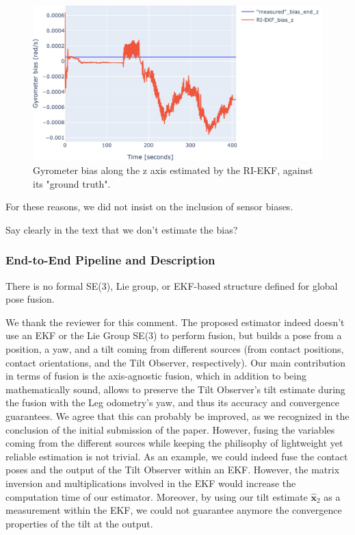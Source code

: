 \begin{figure}[!ht]
\begin{center}
\includegraphics[width=\textwidth]{bias_z.pdf} 
\vskip -0.5pc
\caption{Gyrometer bias along the z axis estimated by the RI-EKF, against its "ground truth".}\label{fig:bias}
\end{center}
\vskip -1.5pc
\end{figure}

For these reasons, we did not insist on the inclusion of sensor biases.


\alert{Say clearly in the text that we don't estimate the bias?}

 

\subsubsection{End-to-End Pipeline and Description}




\begin{revquote}\hypertarget{CommentSe3Fusion}{}
There is no formal SE(3), Lie group, or EKF-based structure defined for global pose fusion.
\end{revquote}


We thank the reviewer for this comment. The proposed estimator indeed doesn't use an EKF or the Lie Group SE(3) to perform fusion, but builds a pose from a position, a yaw, and a tilt coming from different sources (from contact positions, contact orientations, and the Tilt Observer, respectively). Our main contribution in terms of fusion is the axis-agnostic fusion, which in addition to being mathematically sound, allows to preserve the Tilt Observer's tilt estimate during the fusion with the Leg odometry's yaw, and thus its accuracy and convergence guarantees. We agree that this can probably be improved, as we recognized in the conclusion of the initial submission of the paper. However, fusing the variables coming from the different sources while keeping the philisophy of lightweight yet reliable estimation is not trivial. 
As an example, we could indeed fuse the contact poses and the output of the Tilt Observer within an EKF. However, the matrix inversion and multiplications involved in the EKF would increase the computation time of our estimator. Moreover, by using our tilt estimate $\hat{\boldsymbol{x}}_{2}$ as a measurement within the EKF, we could not guarantee anymore the convergence properties of the tilt at the output.

